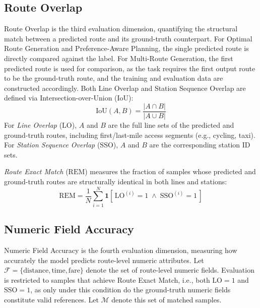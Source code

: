 \documentclass{article}
\begin{document}
\subsection{Route Overlap}
Route Overlap is the third evaluation dimension, quantifying the structural match between a predicted route and its ground-truth counterpart. For Optimal Route Generation and Preference-Aware Planning, the single predicted route is directly compared against the label. For Multi-Route Generation, the first predicted route is used for comparison, as the task requires the first output route to be the ground-truth route, and the training and evaluation data are constructed accordingly. Both Line Overlap and Station Sequence Overlap are defined via Intersection-over-Union (IoU):
\begin{equation}
\text{IoU}(A, B) = \frac{|A \cap B|}{|A \cup B|}
\end{equation}
For \textit{Line Overlap} ($\text{LO}$), $A$ and $B$ are the full line sets of the predicted and ground-truth routes, including first/last-mile access segments (e.g., cycling, taxi). For \textit{Station Sequence Overlap} ($\text{SSO}$), $A$ and $B$ are the corresponding station ID sets.

\textit{Route Exact Match} ($\text{REM}$) measures the fraction of samples whose predicted and ground-truth routes are structurally identical in both lines and stations:
\begin{equation}
\text{REM} = \frac{1}{N}\sum_{i=1}^{N} \mathbf{1}\!\left[\,\text{LO}^{(i)} = 1 \;\wedge\; \text{SSO}^{(i)} = 1\,\right]
\end{equation}

\subsection{Numeric Field Accuracy}

Numeric Field Accuracy is the fourth evaluation dimension, measuring how accurately the model predicts route-level numeric attributes. Let $\mathcal{F} = \{\text{distance}, \text{time}, \text{fare}\}$ denote the set of route-level numeric fields. Evaluation is restricted to samples that achieve Route Exact Match, i.e., both $\text{LO} = 1$ and $\text{SSO} = 1$, as only under this condition do the ground-truth numeric fields constitute valid references. Let $\mathcal{M}$ denote this set of matched samples.
\end{document}
